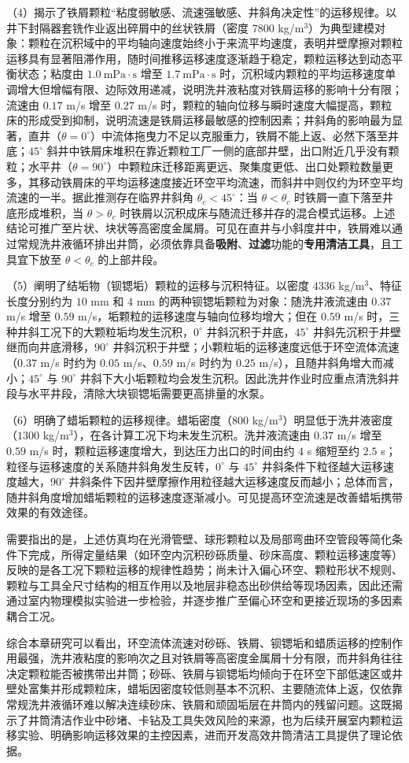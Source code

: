 （4）揭示了铁屑颗粒“粘度弱敏感、流速强敏感、井斜角决定性”的运移规律。以井下封隔器套铣作业返出碎屑中的丝状铁屑（密度 $7800$ kg/m$^{3}$）为典型建模对象：颗粒在沉积域中的平均轴向速度始终小于来流平均速度，表明井壁摩擦对颗粒运移具有显著阻滞作用，随时间推移运移速度逐渐趋于稳定，颗粒运移达到动态平衡状态；粘度由 $1.0\ \mathrm{mPa}\cdot\mathrm{s}$ 增至 $1.7\ \mathrm{mPa}\cdot\mathrm{s}$ 时，沉积域内颗粒的平均运移速度单调增大但增幅有限、边际效用递减，说明洗井液粘度对铁屑运移的影响十分有限；流速由 $0.17$ m/s 增至 $0.27$ m/s 时，颗粒的轴向位移与瞬时速度大幅提高，颗粒床的形成受到抑制，说明流速是铁屑运移最敏感的控制因素；井斜角的影响最为显著，直井（$\theta=0^\circ$）中流体拖曳力不足以克服重力，铁屑不能上返、必然下落至井底；$45^\circ$ 斜井中铁屑床堆积在靠近颗粒工厂一侧的底部井壁，出口附近几乎没有颗粒；水平井（$\theta=90^\circ$）中颗粒床迁移距离更远、聚集度更低、出口处颗粒数量更多，其移动铁屑床的平均运移速度接近环空平均流速，而斜井中则仅约为环空平均流速的一半。据此推测存在临界井斜角 $\theta_c<45^\circ$：当 $\theta<\theta_c$ 时铁屑一直下落至井底形成堆积，当 $\theta>\theta_c$ 时铁屑以沉积成床与随流迁移并存的混合模式运移。上述结论可推广至片状、块状等高密度金属屑。可见在直井与小斜度井中，铁屑难以通过常规洗井液循环排出井筒，必须依靠具备\textbf{吸附}、\textbf{过滤}功能的\textbf{专用清洁工具}，且工具宜下放至 $\theta<\theta_c$ 的上部井段。

（5）阐明了结垢物（钡锶垢）颗粒的运移与沉积特征。以密度 $4336$ kg/m$^{3}$、特征长度分别约为 $10$ mm 和 $4$ mm 的两种钡锶垢颗粒为对象：随洗井液流速由 $0.37$ m/s 增至 $0.59$ m/s，垢颗粒的运移速度与轴向位移均增大；但在 $0.59$ m/s 时，三种井斜工况下的大颗粒垢均发生沉积，$0^\circ$ 井斜沉积于井底，$45^\circ$ 井斜先沉积于井壁继而向井底滑移，$90^\circ$ 井斜沉积于井壁；小颗粒垢的运移速度远低于环空流体流速（$0.37$ m/s 时约为 $0.05$ m/s、$0.59$ m/s 时约为 $0.25$ m/s），且随井斜角增大而减小；$45^\circ$ 与 $90^\circ$ 井斜下大小垢颗粒均会发生沉积。因此洗井作业时应重点清洗斜井段与水平井段，清除大块钡锶垢需要更高排量的水泵。

（6）明确了蜡垢颗粒的运移规律。蜡垢密度（$800$ kg/m$^{3}$）明显低于洗井液密度（$1300$ kg/m$^{3}$），在各计算工况下均未发生沉积。洗井液流速由 $0.37$ m/s 增至 $0.59$ m/s 时，颗粒运移速度增大，到达压力出口的时间由约 $4$ s 缩短至约 $2.5$ s；粒径与运移速度的关系随井斜角发生反转，$0^\circ$ 与 $45^\circ$ 井斜条件下粒径越大运移速度越大，$90^\circ$ 井斜条件下因井壁摩擦作用粒径越大运移速度反而越小；总体而言，随井斜角度增加蜡垢颗粒的运移速度逐渐减小。可见提高环空流速是改善蜡垢携带效果的有效途径。

需要指出的是，上述仿真均在光滑管壁、球形颗粒以及局部弯曲环空管段等简化条件下完成，所得定量结果（如环空内沉积砂砾质量、砂床高度、颗粒运移速度等）反映的是各工况下颗粒运移的规律性趋势；尚未计入偏心环空、颗粒形状不规则、颗粒与工具全尺寸结构的相互作用以及地层非稳态出砂供给等现场因素，因此还需通过室内物理模拟实验进一步检验，并逐步推广至偏心环空和更接近现场的多因素耦合工况。

综合本章研究可以看出，环空流体流速对砂砾、铁屑、钡锶垢和蜡质运移的控制作用最强，洗井液粘度的影响次之且对铁屑等高密度金属屑十分有限，而井斜角往往决定颗粒能否被携带出井筒；砂砾、铁屑与钡锶垢均倾向于在环空下部低速区或井壁处富集并形成颗粒床，蜡垢因密度较低则基本不沉积、主要随流体上返，仅依靠常规洗井液循环难以解决连续砂床、铁屑和顽固垢层在井筒内的残留问题。这既揭示了井筒清洁作业中砂堵、卡钻及工具失效风险的来源，也为后续开展室内颗粒运移实验、明确影响运移效果的主控因素，进而开发高效井筒清洁工具提供了理论依据。
